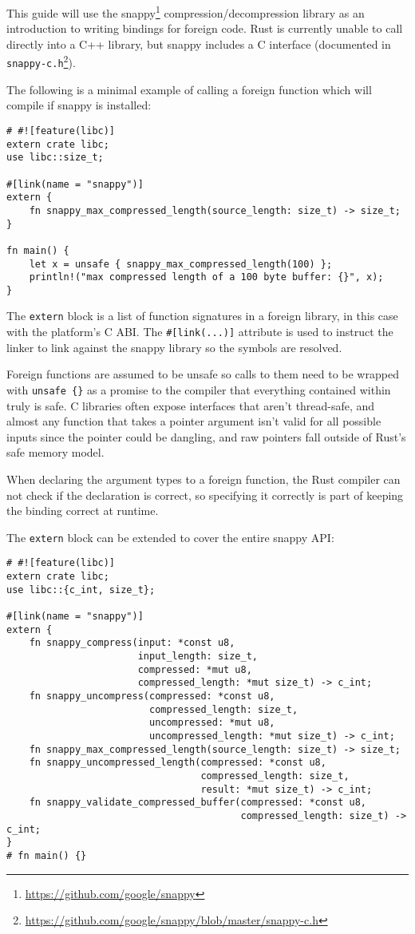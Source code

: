 \documentclass[a4paper,]{book}
\renewcommand{\href}[2]{#2\footnote{\url{#1}}}
\begin{document}
This guide will use the \href{https://github.com/google/snappy}{snappy}
compression/decompression library as an introduction to writing bindings
for foreign code. Rust is currently unable to call directly into a C++
library, but snappy includes a C interface (documented in
\href{https://github.com/google/snappy/blob/master/snappy-c.h}{\texttt{snappy-c.h}}).

The following is a minimal example of calling a foreign function which
will compile if snappy is installed:

\begin{verbatim}
# #![feature(libc)]
extern crate libc;
use libc::size_t;

#[link(name = "snappy")]
extern {
    fn snappy_max_compressed_length(source_length: size_t) -> size_t;
}

fn main() {
    let x = unsafe { snappy_max_compressed_length(100) };
    println!("max compressed length of a 100 byte buffer: {}", x);
}
\end{verbatim}

The \texttt{extern} block is a list of function signatures in a foreign
library, in this case with the platform's C ABI. The
\texttt{\#{[}link(...){]}} attribute is used to instruct the linker to
link against the snappy library so the symbols are resolved.

Foreign functions are assumed to be unsafe so calls to them need to be
wrapped with \texttt{unsafe\ \{\}} as a promise to the compiler that
everything contained within truly is safe. C libraries often expose
interfaces that aren't thread-safe, and almost any function that takes a
pointer argument isn't valid for all possible inputs since the pointer
could be dangling, and raw pointers fall outside of Rust's safe memory
model.

When declaring the argument types to a foreign function, the Rust
compiler can not check if the declaration is correct, so specifying it
correctly is part of keeping the binding correct at runtime.

The \texttt{extern} block can be extended to cover the entire snappy
API:

\begin{verbatim}
# #![feature(libc)]
extern crate libc;
use libc::{c_int, size_t};

#[link(name = "snappy")]
extern {
    fn snappy_compress(input: *const u8,
                       input_length: size_t,
                       compressed: *mut u8,
                       compressed_length: *mut size_t) -> c_int;
    fn snappy_uncompress(compressed: *const u8,
                         compressed_length: size_t,
                         uncompressed: *mut u8,
                         uncompressed_length: *mut size_t) -> c_int;
    fn snappy_max_compressed_length(source_length: size_t) -> size_t;
    fn snappy_uncompressed_length(compressed: *const u8,
                                  compressed_length: size_t,
                                  result: *mut size_t) -> c_int;
    fn snappy_validate_compressed_buffer(compressed: *const u8,
                                         compressed_length: size_t) -> c_int;
}
# fn main() {}
\end{verbatim}
\end{document}
